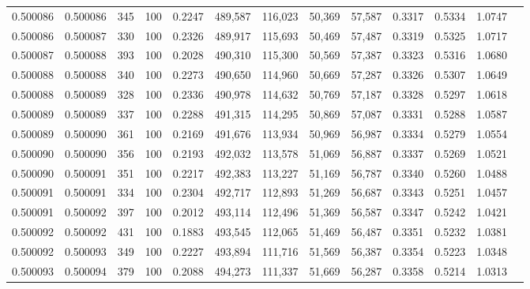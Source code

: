 \begin{tabular}{rrrrrrrrrrrrr}
0.500086 & 0.500086 &   345 & 100 &                                     0.2247 & 489,587 & 116,023 &  50,369 &  57,587 & 0.3317 & 0.5334 & 1.0747 \\
0.500086 & 0.500087 &   330 & 100 &                                     0.2326 & 489,917 & 115,693 &  50,469 &  57,487 & 0.3319 & 0.5325 & 1.0717 \\
0.500087 & 0.500088 &   393 & 100 &                                     0.2028 & 490,310 & 115,300 &  50,569 &  57,387 & 0.3323 & 0.5316 & 1.0680 \\
0.500088 & 0.500088 &   340 & 100 &                                     0.2273 & 490,650 & 114,960 &  50,669 &  57,287 & 0.3326 & 0.5307 & 1.0649 \\
0.500088 & 0.500089 &   328 & 100 &                                     0.2336 & 490,978 & 114,632 &  50,769 &  57,187 & 0.3328 & 0.5297 & 1.0618 \\
0.500089 & 0.500089 &   337 & 100 &                                     0.2288 & 491,315 & 114,295 &  50,869 &  57,087 & 0.3331 & 0.5288 & 1.0587 \\
0.500089 & 0.500090 &   361 & 100 &                                     0.2169 & 491,676 & 113,934 &  50,969 &  56,987 & 0.3334 & 0.5279 & 1.0554 \\
0.500090 & 0.500090 &   356 & 100 &                                     0.2193 & 492,032 & 113,578 &  51,069 &  56,887 & 0.3337 & 0.5269 & 1.0521 \\
0.500090 & 0.500091 &   351 & 100 &                                     0.2217 & 492,383 & 113,227 &  51,169 &  56,787 & 0.3340 & 0.5260 & 1.0488 \\
0.500091 & 0.500091 &   334 & 100 &                                     0.2304 & 492,717 & 112,893 &  51,269 &  56,687 & 0.3343 & 0.5251 & 1.0457 \\
0.500091 & 0.500092 &   397 & 100 &                                     0.2012 & 493,114 & 112,496 &  51,369 &  56,587 & 0.3347 & 0.5242 & 1.0421 \\
0.500092 & 0.500092 &   431 & 100 &                                     0.1883 & 493,545 & 112,065 &  51,469 &  56,487 & 0.3351 & 0.5232 & 1.0381 \\
0.500092 & 0.500093 &   349 & 100 &                                     0.2227 & 493,894 & 111,716 &  51,569 &  56,387 & 0.3354 & 0.5223 & 1.0348 \\
0.500093 & 0.500094 &   379 & 100 &                                     0.2088 & 494,273 & 111,337 &  51,669 &  56,287 & 0.3358 & 0.5214 & 1.0313 \\

\end{tabular}
